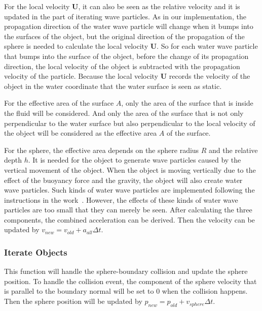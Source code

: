 \documentclass[acmtog]{acmart}
\begin{document}
For the local velocity $\mathbf{U}$, it can also be seen as the relative velocity and it is updated in the part of iterating wave particles. 
As in our implementation, the propagation direction of the water wave particle will change when it bumps into the surfaces of the object, but the original direction of the propagation of the sphere is needed to calculate the local velocity $\mathbf{U}$. 
So for each water wave particle that bumps into the surface of the object, before the change of its propagation direction, the local velocity of the object is subtracted with the propagation velocity of the particle. 
Because the local velocity $\mathbf{U}$ records the velocity of the object in the water coordinate that the water surface is seen as static. 

For the effective area of the surface $A$, only the area of the surface that is inside the fluid will be considered. 
And only the area of the surface that is not only perpendicular to the water surface but also perpendicular to the local velocity of the object will be considered as the effective area $A$ of the surface. 

For the sphere, the effective area depends on the sphere radius $R$ and the relative depth $h$. 
It is needed for the object to generate wave particles caused by the vertical movement of the object. 
When the object is moving vertically due to the effect of the buoyancy force and the gravity, the object will also create water wave particles. 
Such kinds of water wave particles are implemented following the instructions in the work~\cite{yuksel2007wave}. 
However, the effects of these kinds of water wave particles are too small that they can merely be seen.  
After calculating the three components, the combined acceleration can be derived. Then the velocity can be updated by $v_{new} = v_{old} + a_{all} \Delta t$. 
\subsubsection{Iterate Objects}
This function will handle the sphere-boundary collision and update the sphere position. To handle the collision event, the component of the sphere velocity that is parallel to the boundary normal will be set to $0$ when the collision happens.
Then the sphere position will be updated by $p_{new} = p_{old} + v_{sphere} \Delta t$.
\end{document}
